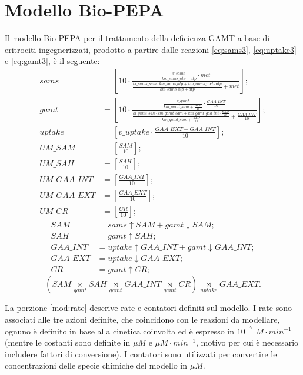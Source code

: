 \section{Modello Bio-PEPA}\label{sez:modpepa}
Il modello Bio-PEPA per il trattamento della deficienza GAMT a base di eritrociti ingegnerizzati, prodotto a partire dalle reazioni \ref{eq:sams3}, \ref{eq:uptake3} e \ref{eq:gamt3}, \`e il seguente:
\begin{align}
	sams &= \left [10 \cdot \frac{\frac{v\_sams}{km\_sams\_atp + atp} \cdot met}{\frac{ki\_sams\_sam \cdot km\_sams\_atp + km\_sams\_met \cdot atp}{km\_sams\_atp + atp} + met} \right ];\nonumber\\
	gamt &= \left [10 \cdot \frac{\frac{v\_gamt}{km\_gamt\_sam + \frac{SAM}{10}} \cdot \frac{GAA\_INT}{10}}{\frac{ki\_gamt\_sah \cdot km\_gamt\_sam + km\_gamt\_gaa\_int \cdot \frac{SAM}{10}}{km\_gamt\_sam + \frac{SAM}{10}} + \frac{GAA\_INT}{10}}\right ];\nonumber\\
	uptake &= \left [v\_uptake \cdot \frac{GAA\_EXT - GAA\_INT}{10} \right ];\nonumber\\
	UM\_SAM &= \left [\frac{SAM}{10}\right ];\nonumber\\
	UM\_SAH &= \left [\frac{SAH}{10}\right ];\nonumber\\
	UM\_GAA\_INT &= \left [\frac{GAA\_INT}{10}\right ];\nonumber\\
	UM\_GAA\_EXT &= \left [\frac{GAA\_EXT}{10}\right ];\nonumber\\
	UM\_CR &= \left [\frac{CR}{10}\right ];\label{mod:rate}
\end{align}
\begin{align}
	SAM &= sams \uparrow SAM + gamt \downarrow SAM;\nonumber\\
	SAH &= gamt \uparrow SAH;\nonumber\\
	GAA\_INT &= uptake \uparrow GAA\_INT + gamt \downarrow GAA\_INT;\nonumber\\
	GAA\_EXT &= uptake \downarrow GAA\_EXT;\nonumber\\
	CR &= gamt \uparrow CR;\label{mod:cost}
\end{align}
\begin{equation}
(SAM \underset{gamt}{\bowtie} SAH \underset{gamt}{\bowtie} GAA\_INT \underset{gamt}{\bowtie} CR)\underset{uptake}{\bowtie} GAA\_EXT.\label{mod:sincr}
\end{equation}

La porzione \ref{mod:rate} descrive rate e contatori definiti sul modello.
I rate sono associati alle tre azioni definite, che coincidono con le reazioni da modellare, ognuno \`e definito in base alla cinetica coinvolta ed \`e espresso in $10^{-7}$ $M \cdot min^{-1}$ (mentre le costanti sono definite in $\mu M$ e $\mu M \cdot min^{-1}$, motivo per cui \`e necessario includere fattori di conversione).
I contatori sono utilizzati per convertire le concentrazioni delle specie chimiche del modello in $\mu M$.

